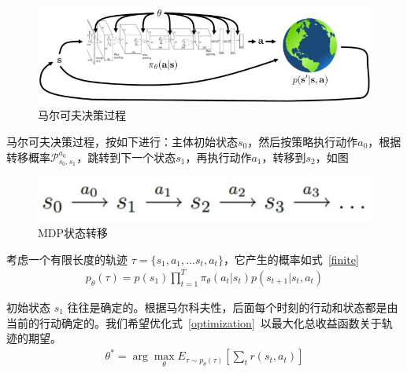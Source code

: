 \begin{figure}[!htbp]\centering
\vspace{1em}
  \includegraphics[width=0.9\linewidth]{figures/MDP.jpg}
  \caption{马尔可夫决策过程}
  \label{fig:MDP}       %
  \vspace{1em}
\end{figure}


马尔可夫决策过程，按如下进行：主体初始状态$s_0$，然后按策略执行动作$a_0$，根据转移概率$\mathcal{P}_{s_0, s_1}^{a_0}$，跳转到下一个状态$s_1$，再执行动作$a_1$，转移到$s_2$，如图
\begin{figure}[!htbp]\centering
\vspace{1em}
  \includegraphics[width=0.9\linewidth]{figures/MDP_trans}
  \caption{MDP状态转移}
  \label{fig:MDP}       %
  \vspace{1em}
\end{figure}

考虑一个有限长度的轨迹 $\tau=\{s_1,a_1,...s_t,a_t\}$，它产生的概率如式~\eqref{finite}~
\begin{equation}
\label{finite}
\begin{aligned}
p_\theta(\tau) = p(s_1)\prod_{t=1}^T \pi_\theta(a_t|s_t)p(s_{t+1}|s_t,a_t)
\end{aligned}
\end{equation}

初始状态 $s_1$ 往往是确定的。根据马尔科夫性，后面每个时刻的行动和状态都是由当前的行动确定的。我们希望优化式~\eqref{optimization}~以最大化总收益函数关于轨迹的期望。
\begin{equation}
\label{optimization}
\begin{aligned}
\theta^* = \arg\max_\theta E_{\tau\sim p_\theta(\tau)}[\sum_t r(s_t, a_t)]
\end{aligned}
\end{equation}


